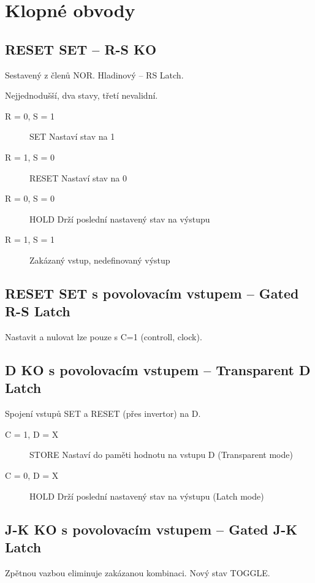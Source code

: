 \documentclass[a4paper, 11pt]{report}
\begin{document}
\section{Klopné obvody}

\subsection{RESET SET -- R-S KO}

Sestavený z členů NOR. Hladinový -- RS Latch.

Nejjednodušší, dva stavy, třetí nevalidní.

\begin{description}
	\item[R = 0, S = 1] SET Nastaví stav na 1
	\item[R = 1, S = 0] RESET Nastaví stav na 0
	\item[R = 0, S = 0] HOLD Drží poslední nastavený stav na výstupu
	\item[R = 1, S = 1] Zakázaný vstup, nedefinovaný výstup
\end{description}

\subsection{RESET SET s povolovacím vstupem -- Gated R-S Latch}

Nastavit a nulovat lze pouze s C=1 (controll, clock).

\subsection{D KO s povolovacím vstupem -- Transparent D Latch}

Spojení vstupů SET a RESET (přes invertor) na D.

\begin{description}
	\item[C = 1, D = X] STORE Nastaví do paměti hodnotu na vstupu D (Transparent mode)
	\item[C = 0, D = X] HOLD Drží poslední nastavený stav na výstupu (Latch mode)
\end{description}

\subsection{J-K KO s povolovacím vstupem -- Gated J-K Latch}

Zpětnou vazbou eliminuje zakázanou kombinaci. Nový stav TOGGLE.
\end{document}
